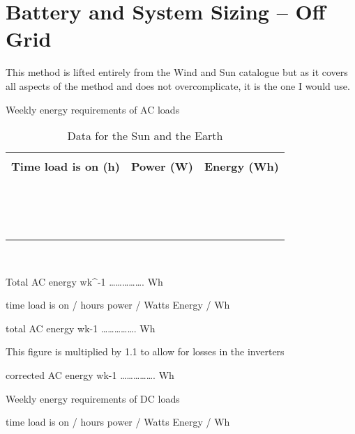 \documentclass[article]{standalone}
\begin{document}
\section{Battery  and System Sizing – Off Grid}

This method is lifted entirely from the Wind and Sun catalogue but as it covers all aspects of the method and does not overcomplicate, it is the one I would use.

Weekly energy requirements of AC loads

\begin{table}[ht] \label{tab:ACloadWeeklyRequirement}
\caption{Data for the Sun and the Earth}
    \begin{tabular}{l l l}
    \hline\\
     \textbf{Time load is on (h)} & 	\textbf{Power (W)} & 	\textbf{Energy (Wh)}\\
    \hline\\
    & &  \\
     \hline\\
     & &  \\
     \hline\\
     & &  \\
     \hline\\
     & &  \\
     \hline\\
     & &  \\
     \hline\\
     & &  \\
     \hline\\
     & &  \\
     \hline\\
    \end{tabular}
\end{table}
\\
\begin{FlushRight}
Total  AC energy wk^{-1} 	…………….	Wh
\end{FlushRight}





time load is on / hours	power / Watts	Energy / Wh

	total  AC energy wk-1 	…………….	Wh

This figure is multiplied by 1.1 to allow for losses in the inverters

						corrected AC energy wk-1 …………….	Wh

Weekly energy requirements of DC loads

time load is on / hours	power / Watts	Energy / Wh
		
\end{document}
